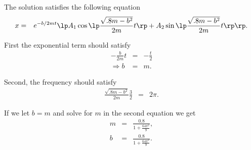 \begin{frame}

  The solution satisfies the following equation
  \begin{eqnarray*}
    x & = & e^{-b/2m t} 
    \lp A_1 \cos\lp\frac{\sqrt{.8m - b^2}}{2m} t\rp + A_2 \sin\lp\frac{\sqrt{.8m - b^2}}{2m} t \rp \rp.
  \end{eqnarray*}

  First the exponential term should satisfy
  \begin{eqnarray*}
    -\frac{b}{2m} t & = & -\frac{t}{2} \\
    \Rightarrow b & = & m.
  \end{eqnarray*}

  Second, the frequency should satisfy
  \begin{eqnarray*}
    \frac{\sqrt{.8m - b^2}}{2m} \frac{3}{2} & = & 2 \pi.
  \end{eqnarray*}

\end{frame}


\begin{frame}

  If we let $b=m$ and solve for $m$ in the second equation we get
  \begin{eqnarray*}
    m & = & \frac{0.8}{1 + \frac{64 \pi^2}{9}}, \\
    b & = & \frac{0.8}{1 + \frac{64 \pi^2}{9}}.  
  \end{eqnarray*}

\end{frame}


